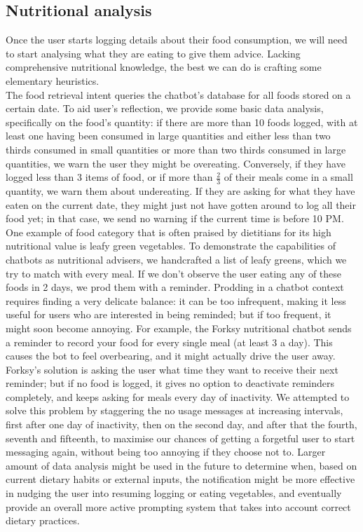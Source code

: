 \subsection{Nutritional analysis}
Once the user starts logging details about their food consumption, we will need to start analysing what they are eating to give them advice. Lacking comprehensive nutritional knowledge, the best we can do is crafting some elementary heuristics. \\
The food retrieval intent queries the chatbot's database for all foods stored on a certain date. To aid user's reflection, we provide some basic data analysis, specifically on the food's quantity: if there are more than 10 foods logged, with at least one having been consumed in large quantities and either less than two thirds consumed in small quantities or more than two thirds consumed in large quantities, we warn the user they might be overeating. Conversely, if they have logged less than 3 items of food, or if more than $\frac{2}{3}$ of their meals come in a small quantity, we warn them about undereating. If they are asking for what they have eaten on the current date, they might just not have gotten around to log all their food yet; in that case, we send no warning if the current time is before 10 PM.\\
One example of food category that is often praised by dietitians for its high nutritional value \cite{bishoppgreens} is leafy green vegetables. To demonstrate the capabilities of chatbots as nutritional advisers, we handcrafted a list of leafy greens, which we try to match with every meal. If we don't observe the user eating any of these foods in 2 days, we prod them with a reminder. Prodding in a chatbot context requires finding a very delicate balance: it can be too infrequent, making it less useful for users who are interested in being reminded; but if too frequent, it  might soon become annoying. For example, the Forksy nutritional chatbot \cite{forksywebsite} sends a reminder to record your food for every single meal (at least 3 a day). This causes the bot to feel overbearing, and it might actually drive the user away. Forksy's solution is asking the user what time they want to receive their next reminder; but if no food is logged, it gives no option to deactivate reminders completely, and keeps asking for meals every day of inactivity. We attempted to solve this problem by staggering the no usage messages at increasing intervals, first after one day of inactivity, then on the second day, and after that the fourth, seventh and fifteenth, to maximise our chances of getting a forgetful user to start messaging again, without being too annoying if they choose not to. Larger amount of data analysis might be used in the future to determine when, based on current dietary habits or external inputs, the notification might be more effective in nudging the user into resuming logging or eating vegetables, and eventually provide an overall more active prompting system that takes into account correct dietary practices.

